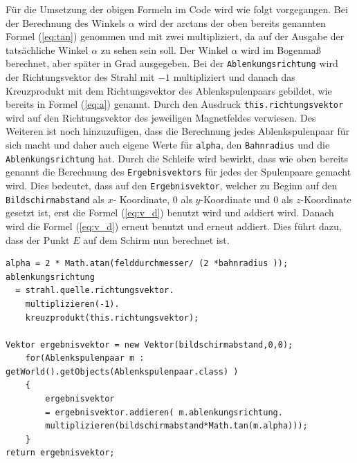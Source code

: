 Für die Umsetzung der obigen Formeln im Code wird wie folgt vorgegangen. 
Bei der Berechnung des Winkels $\alpha$ wird der arctans der oben bereits genannten Formel (\ref{eq:tan}) genommen und mit zwei multipliziert, da auf der Ausgabe der tatsächliche Winkel $\alpha$ zu sehen sein soll.
Der Winkel $\alpha$ wird im Bogenmaß berechnet, aber später in Grad ausgegeben.
Bei der \lstinline$Ablenkungsrichtung$ wird der Richtungsvektor des Strahl mit $-1$ multipliziert und danach das Kreuzprodukt mit dem Richtungsvektor des Ablenkspulenpaars gebildet, wie bereits in Formel (\ref{eq:a}) genannt.
Durch den Ausdruck \lstinline$this.richtungsvektor$ wird auf den Richtungsvektor des jeweiligen Magnetfeldes verwiesen.
Des Weiteren ist noch hinzuzufügen, dass die Berechnung jedes Ablenkspulenpaar für sich macht und daher auch eigene Werte für \lstinline$alpha$, den \lstinline$Bahnradius$ und die \lstinline$Ablenkungsrichtung$ hat.
Durch die Schleife wird bewirkt, dass wie oben bereits genannt die Berechnung des \lstinline$Ergebnisvektors$ für jedes der Spulenpaare gemacht wird.
Dies bedeutet, dass auf den \lstinline$Ergebnisvektor$, welcher zu Beginn auf den \lstinline$Bildschirmabstand$ als $x$- Koordinate, $0$ als $y$-Koordinate und 0 als $z$-Koordinate gesetzt ist, erst die Formel (\ref{eq:v_d}) benutzt wird und addiert wird.
Danach wird die Formel (\ref{eq:v_d}) erneut benutzt und erneut addiert. Dies führt dazu, dass der Punkt $E$ auf dem Schirm nun berechnet ist.

\begin{lstlisting}
alpha = 2 * Math.atan(felddurchmesser/ (2 *bahnradius ));
ablenkungsrichtung
  = strahl.quelle.richtungsvektor.
    multiplizieren(-1).
    kreuzprodukt(this.richtungsvektor);

Vektor ergebnisvektor = new Vektor(bildschirmabstand,0,0);
    for(Ablenkspulenpaar m : getWorld().getObjects(Ablenkspulenpaar.class) )
    {
        ergebnisvektor 
        = ergebnisvektor.addieren( m.ablenkungsrichtung.
        multiplizieren(bildschirmabstand*Math.tan(m.alpha)));
    }
return ergebnisvektor;

\end{lstlisting}

     
